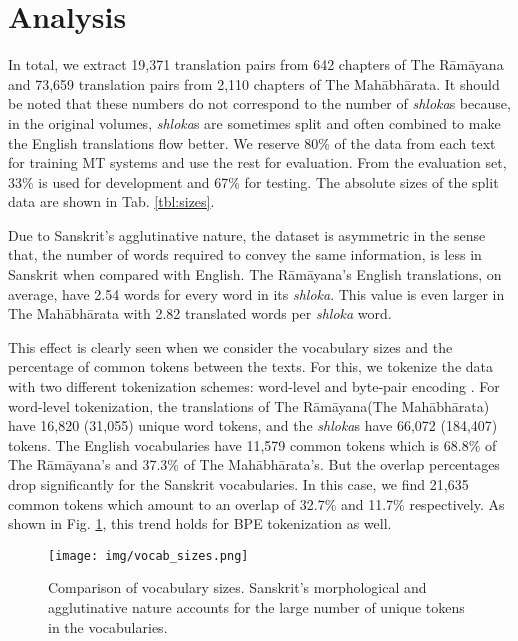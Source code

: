 \documentclass[11pt,a4paper]{article}
\newcommand\ramayana{The R\={a}m\={a}yana\xspace}
\newcommand\mahabharata{The Mah\={a}bh\={a}rata\xspace}
\begin{document}
\section{Analysis}\label{sec:analysis}
In total, we extract 19,371 translation pairs from 642 chapters of \ramayana and 73,659 translation pairs from 2,110 chapters of \mahabharata. It should be noted that these numbers do not correspond to the number of {\it shloka}s because, in the original volumes, {\it shloka}s are sometimes split and often combined to make the English translations flow better. We reserve 80\% of the data from each text for training MT systems and use the rest for evaluation. From the evaluation set, 33\% is used for development and 67\% for testing. The absolute sizes of the split data are shown in Tab. \ref{tbl:sizes}.

Due to Sanskrit's agglutinative nature, the dataset is asymmetric in the sense that, the number of words required to convey the same information, is less in Sanskrit when compared with English. \ramayana's English translations, on average, have 2.54 words for every word in its {\it shloka}. This value is even larger in \mahabharata with 2.82 translated words per {\it shloka} word.

This effect is clearly seen when we consider the vocabulary sizes and the percentage of common tokens between the texts. For this, we tokenize the data with two different tokenization schemes: word-level and byte-pair encoding \cite[BPE]{bpe}. For word-level tokenization, the translations of \ramayana (\mahabharata) have 16,820 (31,055) unique word tokens, and the {\it shloka}s have 66,072 (184,407) tokens. The English vocabularies have 11,579 common tokens which is 68.8\% of \ramayana's and 37.3\% of \mahabharata's. But the overlap percentages drop significantly for the Sanskrit vocabularies. In this case, we find 21,635 common tokens which amount to an overlap of 32.7\% and 11.7\% respectively. As shown in Fig. \ref{fig:vocab}, this trend holds for BPE tokenization as well.


\begin{figure}[t!]
    \centering
    \texttt{[image: img/vocab\_sizes.png]}
    \caption{Comparison of vocabulary sizes. Sanskrit's morphological and agglutinative nature accounts for the large number of unique tokens in the vocabularies. }
    \label{fig:vocab}
\end{figure}
\end{document}
